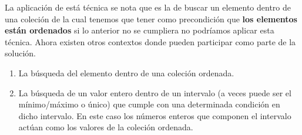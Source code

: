La aplicación de está técnica se nota que es la de buscar un elemento dentro de una coleción de la cual tenemos que tener como precondición que \textbf{los elementos están ordenados} si lo anterior no se cumpliera no podríamos aplicar esta técnica. Ahora existen otros contextos donde pueden participar como parte de la solución.

\begin{enumerate}
	\item La búsqueda del elemento dentro de una coleción ordenada.
	\item La búsqueda de un valor entero dentro de un intervalo (a veces puede ser el mínimo/máximo o único) que cumple con una determinada condición en dicho intervalo. En este caso los números enteros que componen el intervalo actúan como los valores de la coleción ordenada. 
\end{enumerate}